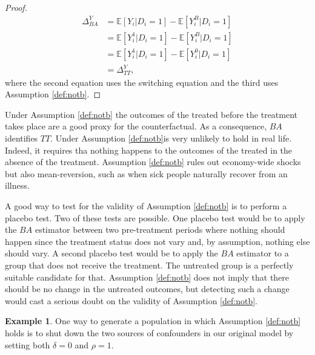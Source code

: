 \documentclass[
]{book}
\newcommand{\esp}[1]{\mathbb{E}[ #1 ]}
\theoremstyle{definition}
\theoremstyle{definition}
\newtheorem{example}{Example}[chapter]
\theoremstyle{definition}
\theoremstyle{definition}
\theoremstyle{remark}
\begin{document}
\begin{proof}
\iffalse{} {Proof. } \fi{}\begin{align*}
\Delta^Y_{BA} & = \esp{Y_i|D_i=1}-\esp{Y_i^B|D_i=1}\\
              & = \esp{Y_i^1|D_i=1}-\esp{Y_i^B|D_i=1}\\
              & = \esp{Y_i^1|D_i=1}-\esp{Y_i^0|D_i=1} \\
              & = \Delta^Y_{TT},
\end{align*}
where the second equation uses the switching equation and the third uses Assumption \ref{def:notb}.
\end{proof}

Under Assumption \ref{def:notb} the outcomes of the treated before the treatment takes place are a good proxy for the counterfactual.
As a consequence, \(BA\) identifies \(TT\).
Under Assumption \ref{def:notb}is very unlikely to hold in real life.
Indeed, it requires tha nothing happens to the outcomes of the treated in the absence of the treatment.
Assumption \ref{def:notb} rules out economy-wide shocks but also mean-reversion, such as when sick people naturally recover from an illness.

A good way to test for the validity of Assumption \ref{def:notb} is to perform a placebo test.
Two of these tests are possible.
One placebo test would be to apply the \(BA\) estimator between two pre-treatment periods where nothing should happen since the treatment status does not vary and, by assumption, nothing else should vary.
A second placebo test would be to apply the \(BA\) estimator to a group that does not receive the treatment.
The untreated group is a perfectly suitable candidate for that.
Assumption \ref{def:notb} does not imply that there should be no change in the untreated outcomes, but detecting such a change would cast a serious doubt on the validity of Assumption \ref{def:notb}.

\begin{example}
\protect\hypertarget{exm:unnamed-chunk-31}{}{\label{exm:unnamed-chunk-31} }One way to generate a population in which Assumption \ref{def:notb} holds is to shut down the two sources of confounders in our original model by setting both \(\delta=0\) and \(\rho=1\).
\end{example}
\end{document}
